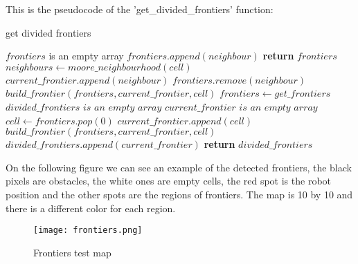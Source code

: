 This is the pseudocode of the 'get\_divided\_frontiers' function:

\FloatBarrier
\begin{algorithm}
    \caption{get divided frontiers}
    \label{get divided frontiers}
    \begin{algorithmic}[1]
            \State $frontiers$ is an empty array
                            \State $frontiers.append(neighbour)$
                        \EndIf
                    \EndFor
                \EndIf
            \EndFor
            \State \textbf{return} $frontiers$
        \EndProcedure
            \State $neighbours \gets moore\_neighbourhood(cell)$
                    \State $current\_frontier.append(neighbour)$
                    \State $frontiers.remove(neighbour)$
                    \State $build\_frontier(frontiers, current\_frontier, cell)$
                \EndIf
            \EndFor
        \EndProcedure
            \State $frontiers \gets get\_frontiers$
            \State $divided\_frontiers$ $is$ $an$ $empty$ $array$
                \State $current\_frontier$ $is$ $an$ $empty$ $array$
                \State $cell \gets frontiers.pop(0)$
                \State $current\_frontier.append(cell)$
                \State $build\_frontier(frontiers, current\_frontier, cell)$
                \State $divided\_frontiers.append(current\_frontier)$
            \EndWhile
            \State \textbf{return} $divided\_frontiers$
        \EndProcedure
    \end{algorithmic}
\end{algorithm}
\FloatBarrier

On the following figure we can see an example of the detected frontiers, the black pixels are obstacles, the white ones are empty cells, the red spot is the robot position and the other spots are the regions of frontiers. 
The map is 10 by 10 and there is a different color for each region.

\FloatBarrier
\begin{figure}
    \centering\texttt{[image: frontiers.png]}
    \label{fig:frontiers}
    \caption{Frontiers test map}
\end{figure}
\FloatBarrier

